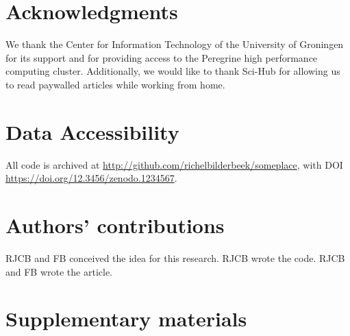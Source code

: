 \section{Acknowledgments}

We thank the Center for Information Technology of the University 
of Groningen for its support and for providing access to the Peregrine 
high performance computing cluster. 
Additionally, we would like to thank Sci-Hub \cite{himmelstein2018sci}
for allowing us to read paywalled articles while working from home.

\section{Data Accessibility}

All code is archived at \url{http://github.com/richelbilderbeek/someplace},
with DOI \url{https://doi.org/12.3456/zenodo.1234567}.

\section{Authors' contributions}

RJCB and FB conceived the idea for this research. 
RJCB wrote the code.
RJCB and FB wrote the article.





\appendix
\section{Supplementary materials}


